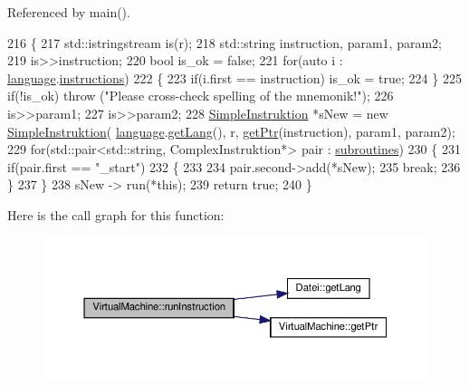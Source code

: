Referenced by main().


\begin{DoxyCode}
216 \{
217     std::istringstream is(r);
218     std::string instruction, param1, param2;
219     is>>instruction;
220     \textcolor{keywordtype}{bool} is\_ok = \textcolor{keyword}{false};
221     \textcolor{keywordflow}{for}(\textcolor{keyword}{auto} i : \mbox{\hyperlink{class_virtual_machine_af4dd2663e7f1ea25ba6c88da94e6ef01}{language}}.\mbox{\hyperlink{class_sprache_a6052a9ec0d1202da4b8ff6e6a52e6244}{instructions}})
222     \{
223         \textcolor{keywordflow}{if}(i.first == instruction) is\_ok = \textcolor{keyword}{true};
224     \}
225     \textcolor{keywordflow}{if}(!is\_ok) \textcolor{keywordflow}{throw} (\textcolor{stringliteral}{"Please cross-check spelling of the mnemonik!"});  
226     is>>param1;
227     is>>param2;
228     \mbox{\hyperlink{class_simple_instruktion}{SimpleInstruktion}} *sNew = \textcolor{keyword}{new} \mbox{\hyperlink{class_simple_instruktion}{SimpleInstruktion}}(
      \mbox{\hyperlink{class_virtual_machine_af4dd2663e7f1ea25ba6c88da94e6ef01}{language}}.\mbox{\hyperlink{class_datei_aeeaf8e269f4d2b53e209ad905b5b75c5}{getLang}}(), r, \mbox{\hyperlink{class_virtual_machine_a7029636f9766e0394a8b9d60264a3565}{getPtr}}(instruction), param1, param2);
229     \textcolor{keywordflow}{for}(std::pair<std::string, ComplexInstruktion*> pair : \mbox{\hyperlink{class_virtual_machine_a91f5b9cfc45eaea5ce95b659705b2803}{subroutines}})
230     \{
231         \textcolor{keywordflow}{if}(pair.first == \textcolor{stringliteral}{"\_start"})
232         \{
233 
234             pair.second->add(*sNew);
235             \textcolor{keywordflow}{break};
236         \}
237     \}
238     sNew -> run(*\textcolor{keyword}{this});
239     \textcolor{keywordflow}{return} \textcolor{keyword}{true};
240 \}
\end{DoxyCode}
Here is the call graph for this function\+:
\nopagebreak
\begin{figure}[H]
\begin{center}
\leavevmode
\includegraphics[width=350pt]{class_virtual_machine_aabeb8078a57ca3bb98c24bc655296e9f_cgraph}
\end{center}
\end{figure}
